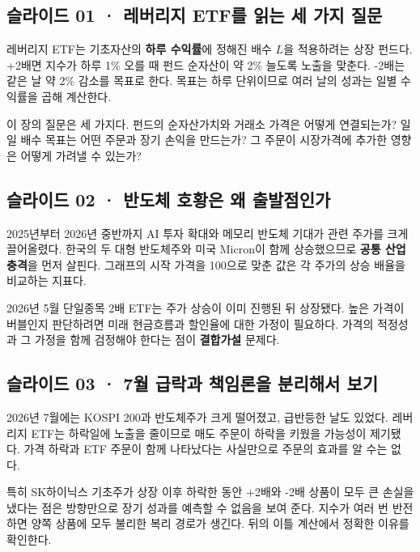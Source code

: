 \documentclass[11pt,a4paper]{article}
\begin{document}
\subsection{슬라이드 01 · 레버리지 ETF를 읽는 세 가지 질문}
레버리지 ETF는 기초자산의 \textbf{하루 수익률}에 정해진 배수 $L$을 적용하려는 상장 펀드다. +2배면 지수가 하루 1\% 오를 때 펀드 순자산이 약 2\% 늘도록 노출을 맞춘다. -2배는 같은 날 약 2\% 감소를 목표로 한다. 목표는 하루 단위이므로 여러 날의 성과는 일별 수익률을 곱해 계산한다.\par

이 장의 질문은 세 가지다. 펀드의 순자산가치와 거래소 가격은 어떻게 연결되는가? 일일 배수 목표는 어떤 주문과 장기 손익을 만드는가? 그 주문이 시장가격에 추가한 영향은 어떻게 가려낼 수 있는가?\par

\subsection{슬라이드 02 · 반도체 호황은 왜 출발점인가}
2025년부터 2026년 중반까지 AI 투자 확대와 메모리 반도체 기대가 관련 주가를 크게 끌어올렸다. 한국의 두 대형 반도체주와 미국 Micron이 함께 상승했으므로 \textbf{공통 산업 충격}을 먼저 살핀다. 그래프의 시작 가격을 100으로 맞춘 값은 각 주가의 상승 배율을 비교하는 지표다.\par

2026년 5월 단일종목 2배 ETF는 주가 상승이 이미 진행된 뒤 상장됐다. 높은 가격이 버블인지 판단하려면 미래 현금흐름과 할인율에 대한 가정이 필요하다. 가격의 적정성과 그 가정을 함께 검정해야 한다는 점이 \textbf{결합가설} 문제다.\par

\subsection{슬라이드 03 · 7월 급락과 책임론을 분리해서 보기}
2026년 7월에는 KOSPI 200과 반도체주가 크게 떨어졌고, 급반등한 날도 있었다. 레버리지 ETF는 하락일에 노출을 줄이므로 매도 주문이 하락을 키웠을 가능성이 제기됐다. 가격 하락과 ETF 주문이 함께 나타났다는 사실만으로 주문의 효과를 알 수는 없다.\par

특히 SK하이닉스 기초주가 상장 이후 하락한 동안 +2배와 -2배 상품이 모두 큰 손실을 냈다는 점은 방향만으로 장기 성과를 예측할 수 없음을 보여 준다. 지수가 여러 번 반전하면 양쪽 상품에 모두 불리한 복리 경로가 생긴다. 뒤의 이틀 계산에서 정확한 이유를 확인한다.\par
\end{document}
